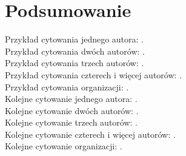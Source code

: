 \clearpage
\chapter{Podsumowanie}

Przykład cytowania jednego autora: \parencite{nowak2010}. \\
Przykład cytowania dwóch autorów: \parencite{nowakKowalski2010}. \\
Przykład cytowania trzech autorów: \parencite{nowakKowalskiIksinska2010}. \\
Przykład cytowania czterech i więcej autorów: \parencite{nowakEtAl2011}. \\
Przykład cytowania organizacji: \parencite{ncn2011}. \\

Kolejne cytowanie jednego autora: \parencite{nowak2010}. \\
Kolejne cytowanie dwóch autorów: \parencite{nowakKowalski2010}. \\
Kolejne cytowanie trzech autorów: \parencite{nowakKowalskiIksinska2010}. \\
Kolejne cytowanie czterech i więcej autorów: \parencite{nowakEtAl2011}. \\
Kolejne cytowanie organizacji: \parencite{ncn2011}. \\